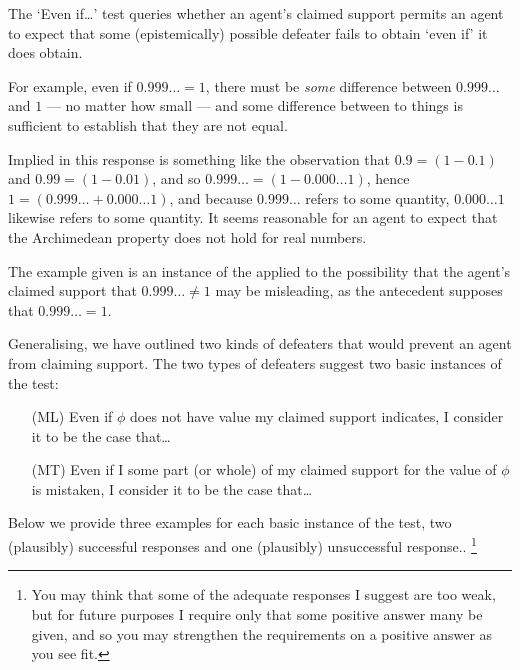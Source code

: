 \begin{note}
  The `Even if\dots' test queries whether an agent's claimed support permits an agent to expect that some (epistemically) possible defeater fails to obtain `even if' it does obtain.

  For example, even if \(0.999\dots = 1\), there must be \emph{some} difference between \(0.999\dots\) and \(1\) --- no matter how small --- and some difference between to things is sufficient to establish that they are not equal.

  Implied in this response is something like the observation that \(0.9 = (1 - 0.1)\) and \(0.99 = (1 - 0.01)\), and so \(0.999\dots = (1 - 0.000\dots 1)\), hence \(1 = (0.999\dots + 0.000\dots 1)\), and because \(0.999\dots\) refers to some quantity, \(0.000\dots 1\) likewise refers to some quantity.
  It seems reasonable for an agent to expect that the Archimedean property does not hold for real numbers.

  The example given is an instance of the applied to the possibility that the agent's claimed support that \(0.999\dots \ne 1\) may be misleading, as the antecedent supposes that \(0.999\dots = 1\).

  Generalising, we have outlined two kinds of defeaters that would prevent an agent from claiming support.
  The two types of defeaters suggest two basic instances of the test:
  \begin{enumerate}
  \item[(ML)] Even if \(\phi\) does not have value my claimed support indicates, I consider it to be the case that\dots
  \item[(MT)] Even if I some part (or whole) of my claimed support for the value of \(\phi\) is mistaken, I consider it to be the case that\dots
  \end{enumerate}
  Below we provide three examples for each basic instance of the test, two (plausibly) successful responses and one (plausibly) unsuccessful response..\nolinebreak
  \footnote{
    You may think that some of the adequate responses I suggest are too weak, but for future purposes I require only that some positive answer many be given, and so you may strengthen the requirements on a positive answer as you see fit.
  }
\end{note}

